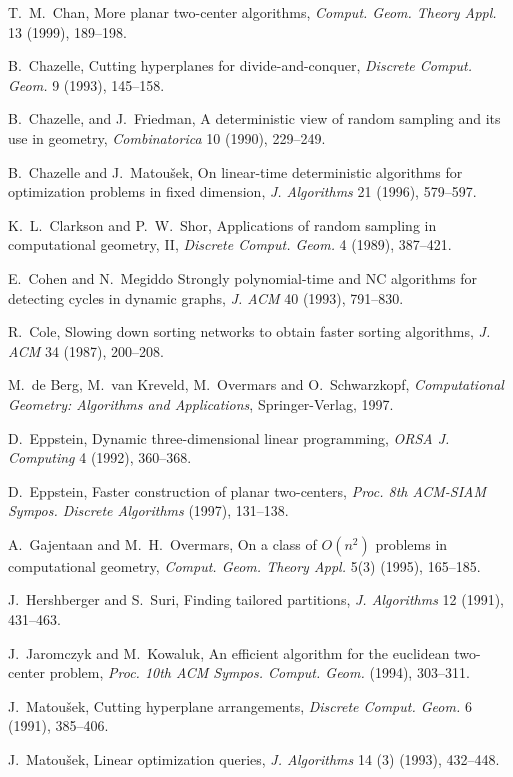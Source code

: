 \documentclass[a4paper,12pt]{article}
\begin{document}
\begin{thebibliography}{}
T.~M.~Chan,
More planar two-center algorithms,
{\it Comput. Geom. Theory Appl.} 13 (1999), 189--198.

B.~Chazelle,
Cutting hyperplanes for divide-and-conquer,
{\it Discrete Comput. Geom.} 9 (1993), 145--158.

B.~Chazelle, and J.~Friedman,
A deterministic view of random sampling and its use in geometry,
{\it Combinatorica} 10 (1990), 229--249.

B.~Chazelle and J.~Matou\v{s}ek,
On linear-time deterministic algorithms for optimization problems
in fixed dimension,
{\it J. Algorithms} 21 (1996), 579--597.

K.~L.~Clarkson and P.~W.~Shor,
Applications of random sampling in computational geometry,
II, {\it Discrete Comput. Geom.} 4 (1989), 387--421.

E.~Cohen and N.~Megiddo
Strongly polynomial-time and NC algorithms for detecting cycles in dynamic graphs,
{\it J. ACM} 40 (1993), 791--830.

R.~Cole, Slowing down sorting networks to obtain faster sorting
algorithms, {\it J. ACM} 34 (1987), 200--208.

M.~de Berg, M.~van Kreveld, M.~Overmars and O.~Schwarzkopf,
{\it Computational Geometry: Algorithms and Applications},
Springer-Verlag, 1997.

D.~Eppstein,
Dynamic three-dimensional linear programming,
{\it ORSA J. Computing} 4 (1992), 360--368.

D.~Eppstein,
Faster construction of planar two-centers,
{\it Proc. 8th ACM-SIAM Sympos. Discrete Algorithms} (1997), 131--138.

A.~Gajentaan and M.~H.~Overmars,
On a class of $O(n^2)$ problems in computational geometry,
{\it Comput. Geom. Theory Appl.} 5(3) (1995), 165--185.

J.~Hershberger and S.~Suri,
Finding tailored partitions,
{\it J. Algorithms} 12 (1991), 431--463.

J.~Jaromczyk and M.~Kowaluk,
An efficient algorithm for the euclidean two-center problem,
{\it Proc. 10th ACM Sympos. Comput. Geom.} (1994), 303--311.

J.~Matou\v{s}ek,
Cutting hyperplane arrangements,
{\it Discrete Comput. Geom.} 6 (1991), 385--406.

J.~Matou\v{s}ek,
Linear optimization queries,
{\it J. Algorithms} 14 (3) (1993), 432--448.


\end{thebibliography}
\end{document}
